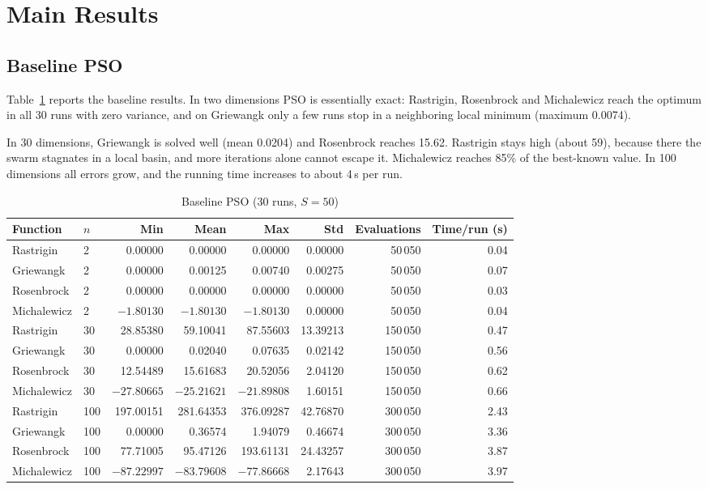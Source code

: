 \documentclass[conference]{IEEEtran}
\begin{document}
\section{Main Results}\label{sec:main}
\subsection{Baseline PSO}
Table~\ref{tab:main} reports the baseline results. In two dimensions PSO is
essentially exact: Rastrigin, Rosenbrock and Michalewicz reach the optimum
in all 30 runs with zero variance, and on Griewangk only a few runs stop in
a neighboring local minimum (maximum 0.0074).

In 30 dimensions, Griewangk is solved well (mean 0.0204) and Rosenbrock
reaches 15.62. Rastrigin stays high (about 59), because there the swarm
stagnates in a local basin, and more iterations alone cannot escape it.
Michalewicz reaches 85\% of the best-known value. In 100 dimensions all
errors grow, and the running time increases to about 4\,s per run.

\begin{table}[t]
\centering
\caption{Baseline PSO (30 runs, $S=50$)}
\label{tab:main}
\begin{tabular}{llrrrrrr}
\toprule
Function & $n$ & Min & Mean & Max & Std & Evaluations & Time/run (s)\\
\midrule
Rastrigin   & 2   & 0.00000 & 0.00000 & 0.00000 & 0.00000 & 50\,050 & 0.04\\
Griewangk   & 2   & 0.00000 & 0.00125 & 0.00740 & 0.00275 & 50\,050 & 0.07\\
Rosenbrock  & 2   & 0.00000 & 0.00000 & 0.00000 & 0.00000 & 50\,050 & 0.03\\
Michalewicz & 2   & $-1.80130$ & $-1.80130$ & $-1.80130$ & 0.00000 & 50\,050 & 0.04\\
\midrule
Rastrigin   & 30  & 28.85380 & 59.10041 & 87.55603 & 13.39213 & 150\,050 & 0.47\\
Griewangk   & 30  & 0.00000 & 0.02040 & 0.07635 & 0.02142 & 150\,050 & 0.56\\
Rosenbrock  & 30  & 12.54489 & 15.61683 & 20.52056 & 2.04120 & 150\,050 & 0.62\\
Michalewicz & 30  & $-27.80665$ & $-25.21621$ & $-21.89808$ & 1.60151 & 150\,050 & 0.66\\
\midrule
Rastrigin   & 100 & 197.00151 & 281.64353 & 376.09287 & 42.76870 & 300\,050 & 2.43\\
Griewangk   & 100 & 0.00000 & 0.36574 & 1.94079 & 0.46674 & 300\,050 & 3.36\\
Rosenbrock  & 100 & 77.71005 & 95.47126 & 193.61131 & 24.43257 & 300\,050 & 3.87\\
Michalewicz & 100 & $-87.22997$ & $-83.79608$ & $-77.86668$ & 2.17643 & 300\,050 & 3.97\\
\bottomrule
\end{tabular}
\end{table}
\end{document}
